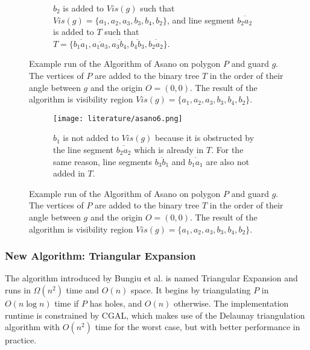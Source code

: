 \begin{figure}[h!]
\begin{subfigure}{0.45\linewidth}
		\caption{$b_2$ is added to $\mathit{Vis}(g)$ such that \\ $\mathit{Vis}(g) = \{a_1, a_2, a_3, b_3, b_4, b_2\}$, and line segment $\overline{b_2a_2}$ is added to $T$ such that \\ $T = \{\overline{b_1a_1}, \overline{a_1a_3}, \overline{a_3b_4}, \overline{b_4b_3}, \overline{b_2a_2}\}$.}
	\end{subfigure}
	\caption{Example run of the Algorithm of Asano \cite{asano1985efficient} on polygon $P$ and guard $g$. The vertices of $P$ are added to the binary tree $T$ in the order of their angle between $g$ and the origin $O = (0, 0)$. The result of the algorithm is visibility region $\mathit{Vis}(g) = \{a_1, a_2, a_3, b_3, b_4, b_2\}$.}
	\label{fig:asano_1}
\end{figure}
\begin{figure}[h!]
	\ContinuedFloat
	\centering

	\begin{subfigure}{\linewidth}
		\centering
		\texttt{[image: literature/asano6.png]}
		\caption{$b_1$ is not added to $\mathit{Vis}(g)$ because it is obstructed by the line segment $\overline{b_2a_2}$ which is already in $T$. For the same reason, line segments $\overline{b_3b_1}$ and $\overline{b_1a_1}$ are also not added in $T$.}
		\label{fig:asano7}
	\end{subfigure}
	\caption{Example run of the Algorithm of Asano \cite{asano1985efficient} on polygon $P$ and guard $g$. The vertices of $P$ are added to the binary tree $T$ in the order of their angle between $g$ and the origin $O = (0, 0)$. The result of the algorithm is visibility region $\mathit{Vis}(g) = \{a_1, a_2, a_3, b_3, b_4, b_2\}$.}
	\label{fig:asano_2}
\end{figure}



\newpage 
\subsubsection{New Algorithm: Triangular Expansion}
The algorithm introduced by Bungiu et al. \cite{DBLP:journals/corr/BungiuHHHK14} is named Triangular Expansion and runs in $\Omega(n^2)$ time and $O(n)$ space. It begins by triangulating $P$ in $O(n \log n)$ time if $P$ has holes, and $O(n)$ otherwise. The implementation runtime is constrained by CGAL, which makes use of the Delaunay triangulation algorithm \cite{delaunay1934sphere} with $O(n^2)$ time for the worst case, but with better performance in practice. 

